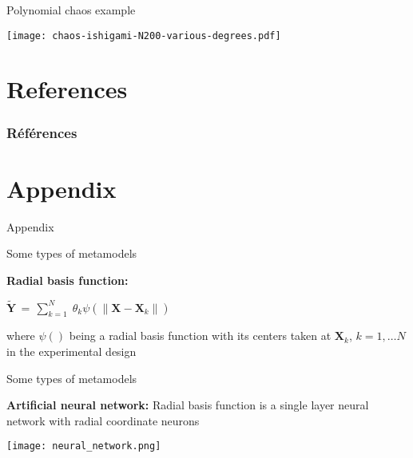 \documentclass{beamer}
\begin{document}
\begin{frame}[t]{Polynomial chaos example}

\begin{center}
 \texttt{[image: chaos-ishigami-N200-various-degrees.pdf]}
\end{center}

\end{frame}


\section{References}
\begin{frame}[allowframebreaks]
\frametitle{Références}
\nocite{*}


\end{frame}


\section{Appendix}
\begin{frame}
\begin{center}
Appendix
\end{center}
\end{frame}


\begin{frame}[t]{Some types of metamodels}

{\bf Radial basis function:}
\begin{center}
$\displaystyle{ \tilde{\boldsymbol{Y}} }\,  = \, 
\sum_{k = 1}^{N}  \; \theta_{k} \psi( \left\lVert \boldsymbol{X} - \boldsymbol{X}_k \right\rVert)   $
\end{center}
where $\psi()$ being a radial basis function with its centers taken at $\boldsymbol{X}_k$, $k = 1, \dots N$ in the experimental design

\end{frame}


\begin{frame}[t]{Some types of metamodels}

{\bf Artificial neural network:}
Radial basis function is a single layer neural network with radial coordinate neurons
\begin{center}
 \texttt{[image: neural\_network.png]}
\end{center}

\end{frame}
\end{document}
